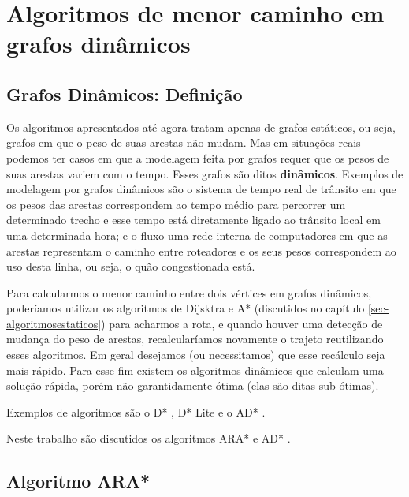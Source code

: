 \chapter{Algoritmos de menor caminho em grafos dinâmicos}
\label{sec-dinamicos}

\section{Grafos Dinâmicos: Definição}
\label{sec-dinamicos-grafos}
Os algoritmos apresentados até agora tratam apenas de grafos estáticos, ou seja, grafos em que o peso de suas arestas não mudam. Mas em situações reais podemos ter casos em que a modelagem feita por grafos requer que os pesos de suas arestas variem com o tempo. Esses grafos são ditos \textbf{dinâmicos}. Exemplos de modelagem por grafos dinâmicos são o sistema de tempo real de trânsito em que os pesos das arestas correspondem ao tempo médio para percorrer um determinado trecho e esse tempo está diretamente ligado ao trânsito local em uma determinada hora; e o fluxo uma rede interna de computadores em que as arestas representam o caminho entre roteadores e os seus pesos correspondem ao uso desta linha, ou seja, o quão congestionada está.

Para calcularmos o menor caminho entre dois vértices em grafos dinâmicos, poderíamos utilizar os algoritmos de Dijsktra e A* (discutidos no capítulo \ref{sec-algoritmosestaticos})  para acharmos a rota, e quando houver uma detecção de mudança do peso de arestas, recalcularíamos novamente o trajeto reutilizando esses algoritmos. Em geral desejamos (ou necessitamos) que esse recálculo seja mais rápido. Para esse fim existem os algoritmos dinâmicos que calculam uma solução rápida, porém não garantidamente ótima (elas são ditas sub-ótimas).

Exemplos de algoritmos são o D* \cite{stentz1994optimal}, D* Lite \cite{koenig2002d} e o AD* \cite{likhachev2008anytime}.

Neste trabalho são discutidos os algoritmos ARA* e AD* \cite{likhachev2008anytime}.
\section{Algoritmo ARA*}
\label{sec-dinamicos-ara}

